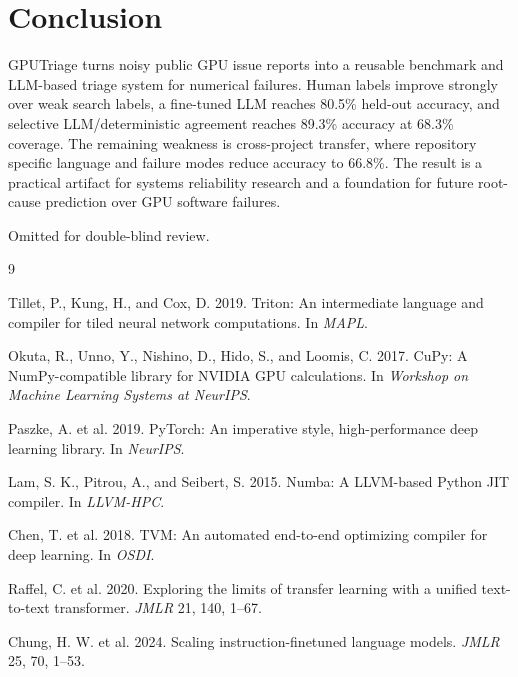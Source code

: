 \documentclass[sigplan,10pt]{acmart}
\newcommand{\system}{GPUTriage}
\begin{document}
\section{Conclusion}

\system{} turns noisy public GPU issue reports into a reusable benchmark and
LLM-based triage system for numerical failures. Human labels improve strongly
over weak search labels, a fine-tuned LLM reaches 80.5\% held-out accuracy, and
selective LLM/deterministic agreement reaches 89.3\% accuracy at 68.3\%
coverage. The remaining weakness is cross-project transfer, where repository
specific language and failure modes reduce accuracy to 66.8\%. The result is a
practical artifact for systems reliability research and a foundation for future
root-cause prediction over GPU software failures.

\begin{acks}
Omitted for double-blind review.
\end{acks}


\begin{thebibliography}{9}

Tillet, P., Kung, H., and Cox, D. 2019. Triton: An intermediate language and
compiler for tiled neural network computations. In \emph{MAPL}.

Okuta, R., Unno, Y., Nishino, D., Hido, S., and Loomis, C. 2017. CuPy: A
NumPy-compatible library for NVIDIA GPU calculations. In \emph{Workshop on
Machine Learning Systems at NeurIPS}.

Paszke, A. et al. 2019. PyTorch: An imperative style, high-performance deep
learning library. In \emph{NeurIPS}.

Lam, S. K., Pitrou, A., and Seibert, S. 2015. Numba: A LLVM-based Python JIT
compiler. In \emph{LLVM-HPC}.

Chen, T. et al. 2018. TVM: An automated end-to-end optimizing compiler for deep
learning. In \emph{OSDI}.

Raffel, C. et al. 2020. Exploring the limits of transfer learning with a
unified text-to-text transformer. \emph{JMLR} 21, 140, 1--67.

Chung, H. W. et al. 2024. Scaling instruction-finetuned language models.
\emph{JMLR} 25, 70, 1--53.

\end{thebibliography}
\end{document}
